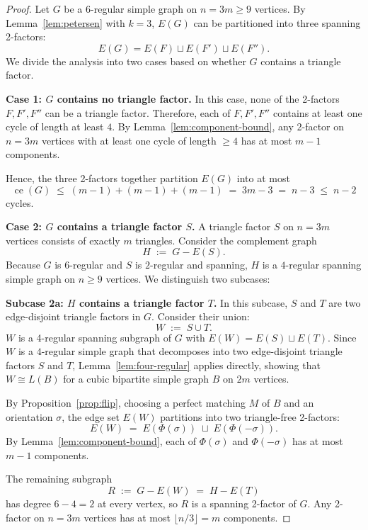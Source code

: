 \documentclass[11pt,reqno]{amsart}
\theoremstyle{definition}
\theoremstyle{remark}
\DeclareMathOperator{\ce}{ce}
\begin{document}
\begin{proof}
Let $G$ be a $6$-regular simple graph on $n = 3m \ge 9$ vertices. By Lemma~\ref{lem:petersen} with $k = 3$, $E(G)$ can be partitioned into three spanning 2-factors:
\[
E(G) = E(F) \sqcup E(F') \sqcup E(F'').
\]
We divide the analysis into two cases based on whether $G$ contains a triangle factor.

\medskip
\noindent\textbf{Case 1: $G$ contains no triangle factor.}
In this case, none of the 2-factors $F, F', F''$ can be a triangle factor. Therefore, each of $F, F', F''$ contains at least one cycle of length at least $4$. By Lemma~\ref{lem:component-bound}, any 2-factor on $n = 3m$ vertices with at least one cycle of length $\ge 4$ has at most $m - 1$ components.

Hence, the three 2-factors together partition $E(G)$ into at most
\[
\ce(G) \;\le\; (m - 1) + (m - 1) + (m - 1) \;=\; 3m - 3 \;=\; n - 3 \;\le\; n - 2
\]
cycles.

\medskip
\noindent\textbf{Case 2: $G$ contains a triangle factor $S$.}
A triangle factor $S$ on $n = 3m$ vertices consists of exactly $m$ triangles. Consider the complement graph
\[
H \;:=\; G - E(S).
\]
Because $G$ is $6$-regular and $S$ is $2$-regular and spanning, $H$ is a $4$-regular spanning simple graph on $n \ge 9$ vertices. We distinguish two subcases:

\medskip
\noindent\textbf{Subcase 2a: $H$ contains a triangle factor $T$.}
In this subcase, $S$ and $T$ are two edge-disjoint triangle factors in $G$. Consider their union:
\[
W \;:=\; S \cup T.
\]
$W$ is a 4-regular spanning subgraph of $G$ with $E(W) = E(S) \sqcup E(T)$. Since $W$ is a $4$-regular simple graph that decomposes into two edge-disjoint triangle factors $S$ and $T$, Lemma~\ref{lem:four-regular} applies directly, showing that $W \cong L(B)$ for a cubic bipartite simple graph $B$ on $2m$ vertices.

By Proposition~\ref{prop:flip}, choosing a perfect matching $M$ of $B$ and an orientation $\sigma$, the edge set $E(W)$ partitions into two triangle-free 2-factors:
\[
E(W) \;=\; E(\Phi(\sigma)) \;\sqcup\; E(\Phi(-\sigma)).
\]
By Lemma~\ref{lem:component-bound}, each of $\Phi(\sigma)$ and $\Phi(-\sigma)$ has at most $m - 1$ components.

The remaining subgraph
\[
R \;:=\; G - E(W) \;=\; H - E(T)
\]
has degree $6 - 4 = 2$ at every vertex, so $R$ is a spanning 2-factor of $G$. Any 2-factor on $n = 3m$ vertices has at most $\lfloor n/3 \rfloor = m$ components.


\end{proof}
\end{document}
